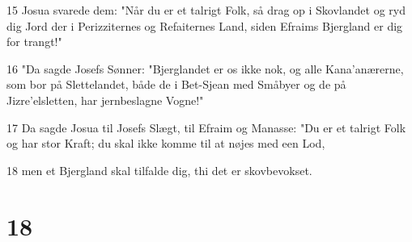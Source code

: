 \par 15 Josua svarede dem: "Når du er et talrigt Folk, så drag op i Skovlandet og ryd dig Jord der i Perizziternes og Refaiternes Land, siden Efraims Bjergland er dig for trangt!"
\par 16 "Da sagde Josefs Sønner: "Bjerglandet er os ikke nok, og alle Kana'anærerne, som bor på Slettelandet, både de i Bet-Sjean med Småbyer og de på Jizre'elsletten, har jernbeslagne Vogne!"
\par 17 Da sagde Josua til Josefs Slægt, til Efraim og Manasse: "Du er et talrigt Folk og har stor Kraft; du skal ikke komme til at nøjes med een Lod,
\par 18 men et Bjergland skal tilfalde dig, thi det er skovbevokset.

\chapter{18}

